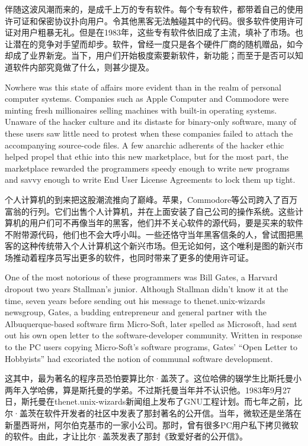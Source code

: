 \ifdefined\chs
伴随这波风潮而来的，是成千上万的专有软件。每个专有软件，都带着自己的使用许可证和保密协议扑向用户。令其他黑客无法触碰其中的代码。很多软件使用许可证对用户粗暴无礼。但是在1983年，这些专有软件依旧成了主流，填补了市场。也让潜在的竞争对手望而却步。软件，曾经一度只是各个硬件厂商的随机赠品，如今却成了业界新宠。当下，用户们开始极度索要新软件，新功能；而至于是否可以知道软件内部究竟做了什么，则甚少提及。
\fi

\ifdefined\eng
Nowhere was this state of affairs more evident than in the realm of personal computer systems. Companies such as Apple Computer and Commodore were minting fresh millionaires selling machines with built-in operating systems. Unaware of the hacker culture and its distaste for binary-only software, many of these users saw little need to protest when these companies failed to attach the accompanying source-code files. A few anarchic adherents of the hacker ethic helped propel that ethic into this new marketplace, but for the most part, the marketplace rewarded the programmers speedy enough to write new programs and savvy enough to write End User License Agreements to lock them up tight.
\fi

\ifdefined\chs
个人计算机的到来把这股潮流推向了巅峰。苹果，Commodore等公司跨入了百万富翁的行列。它们出售个人计算机，并在上面安装了自己公司的操作系统。这些计算机的用户们可不再像当年的黑客，他们并不关心软件的源代码，要是买来的软件不附带源代码，他们也不会大呼小叫。一些还恪守当年黑客信条的人，曾试图把黑客的这种传统带入个人计算机这个新兴市场。但无论如何，这个唯利是图的新兴市场推动着程序员写出更多的软件，也同时带来了更多的使用许可证。
\fi

\ifdefined\eng
One of the most notorious of these programmers was Bill Gates, a Harvard dropout two years Stallman's junior. Although Stallman didn't know it at the time, seven years before sending out his message to thenet.unix-wizards newsgroup, Gates, a budding entrepreneur and general partner with the Albuquerque-based software firm Micro-Soft, later spelled as Microsoft, had sent out his own open letter to the software-developer community. Written in response to the PC users copying Micro-Soft's software programs, Gates' ``Open Letter to Hobbyists'' had excoriated the notion of communal software development.
\fi

\ifdefined\chs
这其中，最为著名的程序员恐怕要算比尔·盖茨了。这位哈佛的辍学生比斯托曼小两年入学哈佛，算是斯托曼的学弟。不过斯托曼当年并不认识他。1983年9月27日，斯托曼在thenet.unix-wizards新闻组上发布了GNU工程计划。而七年之前，比尔·盖茨在软件开发者的社区中发表了那封著名的公开信。当年，微软还是坐落在新墨西哥州，阿尔伯克基市的一家小公司。那时，曾有很多PC用户私下拷贝微软的软件。由此，才让比尔·盖茨发表了那封《致爱好者的公开信》。
\fi

